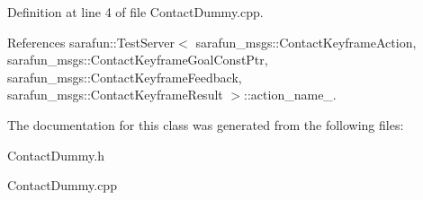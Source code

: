 Definition at line 4 of file Contact\-Dummy.\-cpp.



References sarafun\-::\-Test\-Server$<$ sarafun\-\_\-msgs\-::\-Contact\-Keyframe\-Action, sarafun\-\_\-msgs\-::\-Contact\-Keyframe\-Goal\-Const\-Ptr, sarafun\-\_\-msgs\-::\-Contact\-Keyframe\-Feedback, sarafun\-\_\-msgs\-::\-Contact\-Keyframe\-Result $>$\-::action\-\_\-name\-\_\-.



The documentation for this class was generated from the following files\-:\begin{DoxyCompactItemize}
\item 
Contact\-Dummy.\-h\item 
Contact\-Dummy.\-cpp\end{DoxyCompactItemize}
